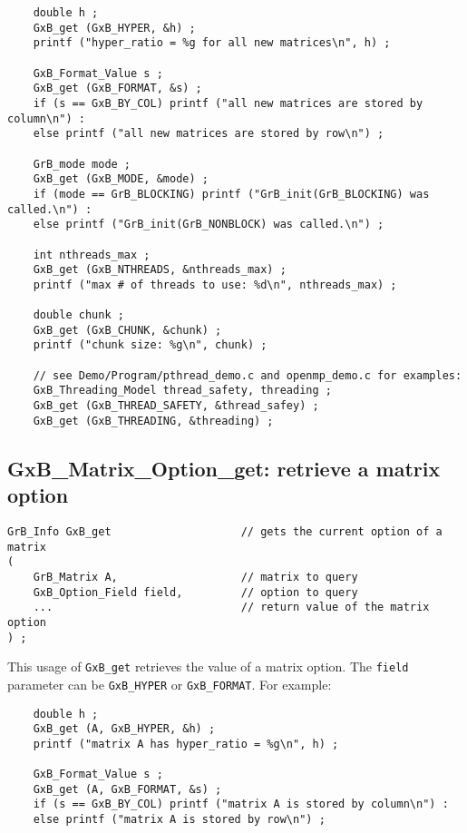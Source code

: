 \documentclass[12pt]{article}
\begin{document}
{\footnotesize
\begin{verbatim}
    double h ;
    GxB_get (GxB_HYPER, &h) ;
    printf ("hyper_ratio = %g for all new matrices\n", h) ;

    GxB_Format_Value s ;
    GxB_get (GxB_FORMAT, &s) ;
    if (s == GxB_BY_COL) printf ("all new matrices are stored by column\n") :
    else printf ("all new matrices are stored by row\n") ;

    GrB_mode mode ;
    GxB_get (GxB_MODE, &mode) ;
    if (mode == GrB_BLOCKING) printf ("GrB_init(GrB_BLOCKING) was called.\n") :
    else printf ("GrB_init(GrB_NONBLOCK) was called.\n") ;

    int nthreads_max ;
    GxB_get (GxB_NTHREADS, &nthreads_max) ;
    printf ("max # of threads to use: %d\n", nthreads_max) ;

    double chunk ;
    GxB_get (GxB_CHUNK, &chunk) ;
    printf ("chunk size: %g\n", chunk) ;

    // see Demo/Program/pthread_demo.c and openmp_demo.c for examples:
    GxB_Threading_Model thread_safety, threading ;
    GxB_get (GxB_THREAD_SAFETY, &thread_safey) ;
    GxB_get (GxB_THREADING, &threading) ; \end{verbatim} }

\subsection{{\sf GxB\_Matrix\_Option\_get:} retrieve a matrix option}

\begin{mdframed}[userdefinedwidth=6in]
{\footnotesize
\begin{verbatim}
GrB_Info GxB_get                    // gets the current option of a matrix
(
    GrB_Matrix A,                   // matrix to query
    GxB_Option_Field field,         // option to query
    ...                             // return value of the matrix option
) ;
\end{verbatim} } \end{mdframed}

This usage of \verb'GxB_get' retrieves the value of a matrix option.
The \verb'field' parameter can be \verb'GxB_HYPER' or \verb'GxB_FORMAT'.
For example:

{\footnotesize
\begin{verbatim}
    double h ;
    GxB_get (A, GxB_HYPER, &h) ;
    printf ("matrix A has hyper_ratio = %g\n", h) ;

    GxB_Format_Value s ;
    GxB_get (A, GxB_FORMAT, &s) ;
    if (s == GxB_BY_COL) printf ("matrix A is stored by column\n") :
    else printf ("matrix A is stored by row\n") ; \end{verbatim} }
\end{document}
